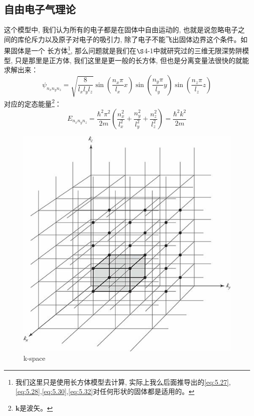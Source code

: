 \subsection{自由电子气理论}
这个模型中, 我们认为所有的电子都是在固体中自由运动的, 也就是说忽略电子之间的库伦斥力以及原子对电子的吸引力, 除了电子不能飞出固体边界这个条件。如果固体是一个
长方体\footnote{我们这里只是使用长方体模型去计算, 实际上我么后面推导出的\ref{eq:5.27},\ref{eq:5.28},\ref{eq:5.30},\ref{eq:5.32}对任何形状的固体都是适用的。}, 那么问题就是我们在$\S$4-1中就研究过的三维无限深势阱模型, 只是那里是正方体, 我们这里是更一般的长方体, 但也是分离变量法很快的就能求解出来：
\begin{equation}
    \psi_{n_{x} n_{y} n_{z}}=\sqrt{\frac{8}{l_{x} l_{y} l_{z}}} \sin \left(\frac{n_{x} \pi}{l_{x}} x\right) \sin \left(\frac{n_{y} \pi}{l_{y}} y\right) \sin \left(\frac{n_{z} \pi}{l_{z}} z\right)
\end{equation}
对应的定态能量\footnote{$\mathbf{k}$是波矢。}：
\begin{equation}
    \label{eq:5.25}
    E_{n_{x} n_{y} n_{z}}=\frac{\hbar^{2} \pi^{2}}{2 m}\left(\frac{n_{x}^{2}}{l_{x}^{2}}+\frac{n_{y}^{2}}{l_{y}^{2}}+\frac{n_{z}^{2}}{l_{z}^{2}}\right)=\frac{\hbar^{2} k^{2}}{2 m}
\end{equation}

\begin{figure}[htbp]
    \centering
    \includegraphics[scale=0.72]{fig/5-2.jpg}
    \caption{k-space}
    \label{fig:5-2}
\end{figure}

